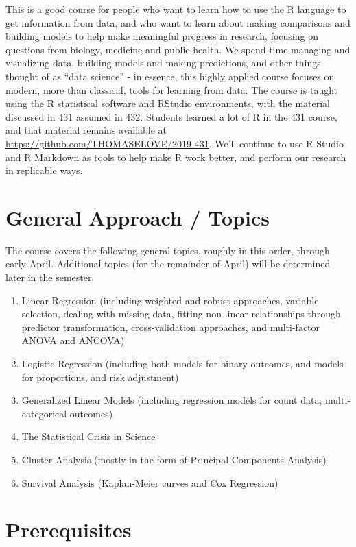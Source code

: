 \documentclass[
]{book}
\providecommand{\tightlist}{%
  \setlength{\itemsep}{0pt}\setlength{\parskip}{0pt}}
\begin{document}
This is a good course for people who want to learn how to use the R language to get information from data, and who want to learn about making comparisons and building models to help make meaningful progress in research, focusing on questions from biology, medicine and public health. We spend time managing and visualizing data, building models and making predictions, and other things thought of as ``data science'' - in essence, this highly applied course focuses on modern, more than classical, tools for learning from data. The course is taught using the R statistical software and RStudio environments, with the material discussed in 431 assumed in 432. Students learned a lot of R in the 431 course, and that material remains available at \url{https://github.com/THOMASELOVE/2019-431}. We'll continue to use R Studio and R Markdown as tools to help make R work better, and perform our research in replicable ways.

\hypertarget{general-approach-topics}{%
\section{General Approach / Topics}\label{general-approach-topics}}

The course covers the following general topics, roughly in this order, through early April. Additional topics (for the remainder of April) will be determined later in the semester.

\begin{enumerate}
\def\labelenumi{\arabic{enumi}.}
\tightlist
\item
  Linear Regression (including weighted and robust approaches, variable selection, dealing with missing data, fitting non-linear relationships through predictor transformation, cross-validation approaches, and multi-factor ANOVA and ANCOVA)
\item
  Logistic Regression (including both models for binary outcomes, and models for proportions, and risk adjustment)
\item
  Generalized Linear Models (including regression models for count data, multi-categorical outcomes)
\item
  The Statistical Crisis in Science
\item
  Cluster Analysis (mostly in the form of Principal Components Analysis)
\item
  Survival Analysis (Kaplan-Meier curves and Cox Regression)
\end{enumerate}

\hypertarget{prerequisites-1}{%
\section{Prerequisites}\label{prerequisites-1}}
\end{document}
